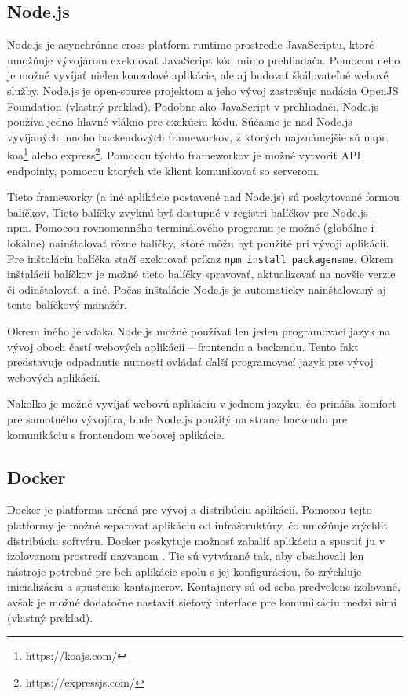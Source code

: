 \subsection {Node.js}
Node.js je asynchrónne cross-platform runtime prostredie JavaScriptu, ktoré umožňuje vývojárom exekuovať JavaScript kód mimo prehliadača. Pomocou neho je možné vyvíjať nielen konzolové aplikácie, ale aj budovať škálovateľné webové služby. Node.js je open-source projektom a jeho vývoj zastrešuje nadácia OpenJS Foundation \cite{about_nodejs} (vlastný preklad). Podobne ako JavaScript v prehliadači, Node.js používa jedno hlavné vlákno pre exekúciu kódu. Súčasne je nad Node.js vyvíjaných mnoho backendových frameworkov, z ktorých najznámejšie sú napr. koa\footnote{https://koajs.com/} alebo express\footnote{https://expressjs.com/}. Pomocou týchto frameworkov je možné vytvoriť API endpointy, pomocou ktorých vie klient komunikovať so serverom.

Tieto frameworky (a iné aplikácie postavené nad Node.js) sú poskytované formou balíčkov. Tieto balíčky zvyknú byť dostupné v registri balíčkov pre Node.js -- npm. Pomocou rovnomenného terminálového programu je možné (globálne i lokálne) nainštalovať rôzne balíčky, ktoré môžu byť použité pri vývoji aplikácií. Pre inštaláciu balíčka stačí exekuovať príkaz \texttt{npm install packagename}. Okrem inštalácií balíčkov je možné tieto balíčky spravovať, aktualizovať na novšie verzie či odinštalovať, a iné. Počas inštalácie Node.js je automaticky nainštalovaný aj tento balíčkový manažér.

Okrem iného je vďaka Node.js možné používať len jeden programovací jazyk na vývoj oboch častí webových aplikácii -- frontendu a backendu. Tento fakt predstavuje odpadnutie nutnosti ovládať ďalší programovací jazyk pre vývoj webových aplikácií.

Nakoľko je možné vyvíjať webovú aplikáciu v jednom jazyku, čo prináša komfort pre samotného vývojára, bude Node.js použitý na strane backendu pre komunikáciu s frontendom webovej aplikácie.

\subsection {Docker}
Docker je platforma určená pre vývoj a distribúciu aplikácií. Pomocou tejto platformy je možné separovať aplikáciu od infraštruktúry, čo umožňuje zrýchliť distribúciu softvéru. Docker poskytuje možnosť zabaliť aplikáciu a spustiť ju v izolovanom prostredí nazvanom . Tie sú vytvárané tak, aby obsahovali len nástroje potrebné pre beh aplikácie spolu s jej konfiguráciou, čo zrýchluje inicializáciu a spustenie kontajnerov. Kontajnery sú od seba predvolene izolované, avšak je možné dodatočne nastaviť sieťový interface pre komunikáciu medzi nimi \cite{about_docker} (vlastný preklad).

